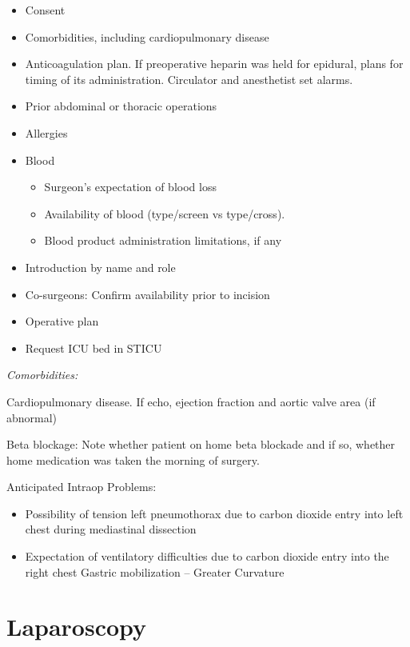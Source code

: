\documentclass[
  letterpaper,
]{scrbook}
\providecommand{\tightlist}{%
  \setlength{\itemsep}{0pt}\setlength{\parskip}{0pt}}
\begin{document}
\begin{itemize}
\tightlist
\item
  Consent
\item
  Comorbidities, including cardiopulmonary disease
\item
  Anticoagulation plan. If preoperative heparin was held for epidural,
  plans for timing of its administration. Circulator and anesthetist set
  alarms.
\item
  Prior abdominal or thoracic operations
\item
  Allergies
\item
  Blood

  \begin{itemize}
  \tightlist
  \item
    Surgeon's expectation of blood loss
  \item
    Availability of blood (type/screen vs type/cross).
  \item
    Blood product administration limitations, if any
  \end{itemize}
\item
  Introduction by name and role
\item
  Co-surgeons: Confirm availability prior to incision
\item
  Operative plan
\item
  Request ICU bed in STICU
\end{itemize}

\emph{Comorbidities:}

Cardiopulmonary disease. If echo, ejection fraction and aortic valve
area (if abnormal)

Beta blockage: Note whether patient on home beta blockade and if so,
whether home medication was taken the morning of surgery.

Anticipated Intraop Problems:

\begin{itemize}
\tightlist
\item
  Possibility of tension left pneumothorax due to carbon dioxide entry
  into left chest during mediastinal dissection
\item
  Expectation of ventilatory difficulties due to carbon dioxide entry
  into the right chest Gastric mobilization -- Greater Curvature
\end{itemize}

\section{Laparoscopy}\label{laparoscopy}
\end{document}
